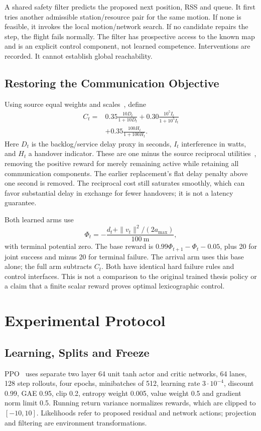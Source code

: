 \documentclass[conference]{IEEEtran}
\begin{document}
A shared safety filter predicts the proposed next position, RSS and queue. It
first tries another admissible station/resource pair for the same motion. If
none is feasible, it invokes the local motion/network search. If no candidate
repairs the step, the flight fails normally. The filter has prospective access
to the known map and is an explicit control component, not learned competence.
Interventions are recorded. It cannot establish global reachability.

\subsection{Restoring the Communication Objective}
Using source equal weights and scales~\cite[p.~15, Table~3]{thesis}, define
\begin{align}
C_t={}&0.35\frac{10D_t}{1+10D_t}
 +0.30\frac{10^5I_t}{1+10^5I_t}\nonumber\\
 &+0.35\frac{100H_t}{1+100H_t}.
\end{align}
Here $D_t$ is the backlog/service delay proxy in seconds, $I_t$ interference in
watts, and $H_t$ a handover indicator. These are one minus the source reciprocal
utilities~\cite[p.~12, Eq.~(13)]{thesis}, removing the positive reward for merely
remaining active while retaining all communication components. The earlier
replacement's flat delay penalty above one second is removed. The reciprocal
cost still saturates smoothly, which can favor substantial delay in exchange
for fewer handovers; it is not a latency guarantee.

Both learned arms use
\begin{equation}
\Phi_t=-\frac{d_t+\|v_t\|^2/(2a_{\max})}{100\ \mathrm{m}},
\end{equation}
with terminal potential zero. The base reward is $0.99\Phi_{t+1}-\Phi_t-0.05$,
plus 20 for joint success and minus 20 for terminal failure. The arrival arm
uses this base alone; the full arm subtracts $C_t$. Both have identical hard
failure rules and control interfaces. This is not a comparison to the original
trained thesis policy or a claim that a finite scalar reward proves optimal
lexicographic control.

\section{Experimental Protocol}
\subsection{Learning, Splits and Freeze}
PPO~\cite{ppo} uses separate two layer 64 unit tanh actor and critic networks,
64 lanes, 128 step rollouts, four epochs, minibatches of 512, learning rate
$3\cdot10^{-4}$, discount 0.99, GAE 0.95, clip 0.2, entropy weight 0.005,
value weight 0.5 and gradient norm limit 0.5. Running return variance normalizes
rewards, which are clipped to $[-10,10]$. Likelihoods refer to proposed residual
and network actions; projection and filtering are environment transformations.
\end{document}
